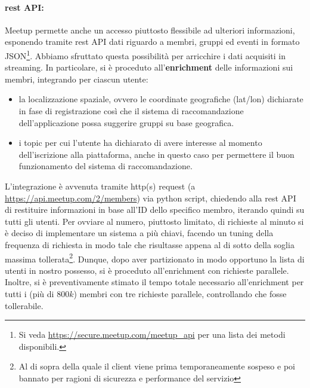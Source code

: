 \documentclass[fleqn,10pt]{SelfArx} %
\begin{document}
{\paragraph{rest API:} Meetup permette anche un accesso piuttosto flessibile ad ulteriori informazioni, esponendo tramite rest API dati riguardo a membri, gruppi ed eventi in formato JSON\footnote{Si veda \url{https://secure.meetup.com/meetup_api} per una lista dei metodi disponibili.}.
Abbiamo sfruttato questa possibilità per arricchire i dati acquisiti in streaming. 
In particolare, si è proceduto all'\textbf{enrichment} delle informazioni sui membri, integrando per ciascun utente:
\begin{itemize}[noitemsep]
\item la localizzazione spaziale, ovvero le coordinate geografiche (lat/lon) dichiarate in fase di registrazione così che il sistema di raccomandazione dell'applicazione possa suggerire gruppi su base geografica.
\item i topic per cui l'utente ha dichiarato di avere interesse al momento dell'iscrizione alla piattaforma, anche in questo caso per permettere il buon funzionamento del sistema di raccomandazione.
\end{itemize}
L'integrazione è avvenuta tramite http(s) request (a \url{https://api.meetup.com/2/members}) via python script, chiedendo alla rest API di restituire informazioni in base all'ID dello specifico membro, iterando quindi su tutti gli utenti.
Per ovviare al numero, piuttosto limitato, di richieste al minuto si è deciso di implementare un sistema a più chiavi, facendo un tuning della frequenza di richiesta in modo tale che risultasse appena al di sotto della soglia massima tollerata\footnote{Al di sopra della quale il client viene prima temporaneamente sospeso e poi bannato per ragioni di sicurezza e performance del servizio}.
Dunque, dopo aver partizionato in modo opportuno la lista di utenti in nostro possesso, si è proceduto all'enrichment con richieste parallele. 
Inoltre, si è preventivamente stimato il tempo totale necessario all'enrichment per tutti i (più di $800k$) membri con tre richieste parallele, controllando che fosse tollerabile.
}
\end{document}
